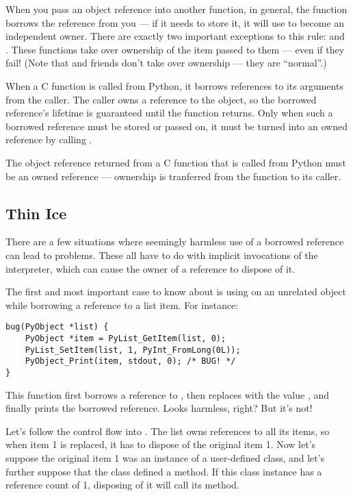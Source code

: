 When you pass an object reference into another function, in general,
the function borrows the reference from you --- if it needs to store
it, it will use  to become an independent owner.
There are exactly two important exceptions to this rule:
 and .  These functions
take over ownership of the item passed to them --- even if they fail!
(Note that  and friends don't take over
ownership --- they are ``normal''.)

When a C function is called from Python, it borrows references to its
arguments from the caller.  The caller owns a reference to the object,
so the borrowed reference's lifetime is guaranteed until the function
returns.  Only when such a borrowed reference must be stored or passed
on, it must be turned into an owned reference by calling
.

The object reference returned from a C function that is called from
Python must be an owned reference --- ownership is tranferred from the
function to its caller.

\subsection{Thin Ice}

There are a few situations where seemingly harmless use of a borrowed
reference can lead to problems.  These all have to do with implicit
invocations of the interpreter, which can cause the owner of a
reference to dispose of it.

The first and most important case to know about is using
 on an unrelated object while borrowing a reference
to a list item.  For instance:

\begin{verbatim}
bug(PyObject *list) {
    PyObject *item = PyList_GetItem(list, 0);
    PyList_SetItem(list, 1, PyInt_FromLong(0L));
    PyObject_Print(item, stdout, 0); /* BUG! */
}
\end{verbatim}

This function first borrows a reference to , then
replaces  with the value , and finally prints
the borrowed reference.  Looks harmless, right?  But it's not!

Let's follow the control flow into .  The list
owns references to all its items, so when item 1 is replaced, it has
to dispose of the original item 1.  Now let's suppose the original
item 1 was an instance of a user-defined class, and let's further
suppose that the class defined a  method.  If this
class instance has a reference count of 1, disposing of it will call
its  method.

